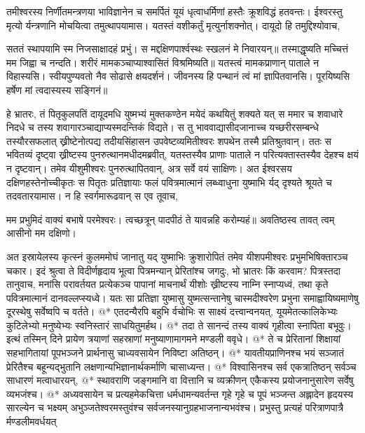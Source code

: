 \vakya तमीश्वरस्य निर्णीतमन्त्रणया भाविज्ञानेन च समर्पितं यूयं धृत्वाधर्मिणां हस्तैः क्रूशविद्धं हतवन्तः।
\vakya ईश्वरस्तु मृत्यो र्यन्त्रणानि मोचयित्वा तमुत्थापयामास।
\vakya यतस्तं वशीकर्तुं मृत्युर्नाशक्नोत्। दायूदो हि तमुद्दिश्योवाच,
\begin{poem}
\startwithline सततं स्थापयामि स्म निजसाक्षादहं प्रभुं।
\pline स मद्दक्षिणपार्श्वस्थः स्खलनं मे निवारयन्॥
\vakya तस्माद्धृष्यति मच्चित्तं मम जिह्वा च नन्दति।
\pline शरीरं मामकञ्चाप्याश्वासितं विश्रमिष्यति॥
\vakya यतस्त्वं मामकप्राणान् पाताले न विहास्यसि।
\pline स्वीयपुण्यवतो नैव सोढासे क्षयदर्शनं।
\vakya जीवनस्य हि पन्थानं त्वं मां ज्ञापितवानसि।
\pline पूरयिष्यसि हर्षेण मां त्वदास्यस्य सङ्गिनं॥
\end{poem}
\vakya हे भ्रातरः, तं पितृकुलपतिं दायूदमधि युष्मभ्यं मुक्तकण्ठेन मयेदं कथयितुं शक्यते यत् स ममार च शवाधारे निदधे च तस्य शवागारञ्चाद्याप्यस्मदन्तिकं विद्यते।
\vakya स तु भाववाद्यासीदजानाच्च यच्छरीरसम्बन्धे तस्यौरसफलात् ख्रीष्टेनोत्पद्य तदीयसिंहासन उपवेष्टव्यमितीश्वरः शपथेन तस्मै प्रतिश्रुतवान्।
\vakya ततः स भवितव्यं दृष्ट्वा ख्रीष्टस्य पुनरुत्थानमधीदमब्रवीत्, यतस्तस्यैव प्राणाः पाताले न परित्यक्तास्तस्यैव देहश्च क्षयं न दृष्टवान्।
\vakya तमेव यीशुमीश्वरः पुनरुत्थापितवान्, अत्र सर्वे वयं साक्षिणः।
\vakya अत ईश्वरसय दक्षिणहस्तेनोच्चीकृतः स पितृतः प्रतिज्ञायाः फलं पवित्रमात्मानं लब्ध्वाधुना युष्माभि र्यद् दृश्यते श्रूयते च तदवतारयामास।
\vakya न हि स्वर्गमारूढवान् स एव तूवाच,
\begin{poem}
\startwithline मम प्रभुमिदं वाक्यं बभाषे परमेश्वरः।
\vakya त्वच्छत्रून् पादपीठं ते यावन्नहि करोम्यहं॥
\pline अवतिष्ठस्व तावत् त्वम् आसीनो मम दक्षिणो।
\end{poem}
\vakya अत इस्रायेलस्य कृत्स्नं कुलममोघं जानातु यद् युष्माभिः क्रुशारोपितं तमेव यीशपमीश्वरः प्रभुमभिषिक्तारञ्च चकार।
\vakya इदं श्रुत्वा ते विदीर्णहृदाय भूत्वा पित्रमन्यान् प्रेरितांश्च जगदुः, भो भ्रातरः किं करवाम?
\vakya पित्रस्तदा तानुवाच, मनांसि परावर्तयत प्रत्येकञ्च पापानां माचनार्थं यीशोः ख्रीष्टस्य नाम्नि स्नाप्यध्वं, तथा कृते पवित्रमात्मानं दानवल्लप्स्यध्वे।
\vakya यतः सा प्रतिज्ञा युष्मासु युष्मत्सन्तानेषु चास्मदीश्वरेण प्रभुना समाह्वायिष्यमाणेषु दूरस्थेषु सर्वेष्वपि च वर्तते।
@* एतदन्यैरपि बहुभि र्वचोभिः स साक्ष्यं दत्त्वान्वनयत्, यूयमेतत्कालिकेभ्यः कुटिलेभ्यो मनुष्येभ्यः स्वनिस्तारं साधयितुमर्हथ।
@* तदा ते सानन्दं तस्य वाक्यं गृहीत्वा स्नापिता बभूवुः। इत्थं तस्मिन् दिने प्रायेण त्रयाणां सहस्राणां मनुष्याणामागमने मण्डली ववृधे।
@* ते च प्रेरितानां शिक्षायां सहभागितायां पूपभञ्जने प्रार्थनासु चाध्यवसायेन निविष्टा अतिष्ठन्।
@* यावतीयप्राणिनश्च भयं सञ्जातं प्रेरितैश्च बहून्यद्भुतानि लक्षणान्यभिज्ञानार्थकर्माणि चासाध्यन्त।
@* विश्वासिनश्च सर्व एकत्रातिष्ठन् सर्वञ्च साधारणं मत्वाधारयन्,
@* स्थावराणि जङ्गमानि वा वित्तानि च व्यक्रीणन् एकैकस्य प्रयोजनानुसारेण सर्वेषु व्यभजंश्च।
@* अध्यवसायेन च प्रत्यहमेकचित्ता धर्मधामन्यवर्तन्त गृहे गृहे च पूपं भञ्जन्त अह्लादेन हृदयस्य सारल्येन च भक्ष्यम् अभुञ्जतेश्वरमस्तुवंश्च सर्वजनस्यानुग्रहभाजनान्यभवंश्च। प्रभुस्तु प्रत्यहं परित्राणपात्रै र्मण्डलीमवर्धयत्\eoc